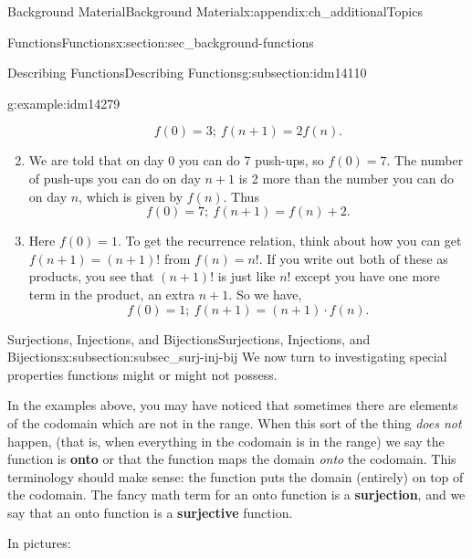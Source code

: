 \documentclass[oneside,10pt,]{book}
\newcommand{\terminology}[1]{\textbf{#1}}
\numberwithin{equation}{chapter}
\begin{document}
\begin{appendixptx}{Background Material}{}{Background Material}{}{}{x:appendix:ch_additionalTopics}
\begin{sectionptx}{Functions}{}{Functions}{}{}{x:section:sec_background-functions}
\begin{subsectionptx}{Describing Functions}{}{Describing Functions}{}{}{g:subsection:idm14110}
\begin{example}{}{g:example:idm14279}
\begin{enumerate}
\begin{equation*}
f(0) = 3;~ f(n+1) = 2f(n).
\end{equation*}
%
\item{}We are told that on day 0 you can do 7 push-ups, so \(f(0) = 7\).  The number of push-ups you can do on day \(n+1\) is 2 more than the number you can do on day \(n\), which is given by \(f(n)\).  Thus%
\begin{equation*}
f(0) = 7;~ f(n+1) = f(n) + 2.
\end{equation*}
%
\item{}Here \(f(0) = 1\).  To get the recurrence relation, think about how you can get \(f(n+1) = (n+1)!\) from \(f(n) = n!\).  If you write out both of these as products, you see that \((n+1)!\) is just like \(n!\) except you have one more term in the product, an extra \(n+1\).  So we have,%
\begin{equation*}
f(0) = 1;~ f(n+1) = (n+1)\cdot f(n).
\end{equation*}
%
\end{enumerate}
%
\end{example}
\end{subsectionptx}
%
%
\typeout{************************************************}
\typeout{************************************************}
%
\begin{subsectionptx}{Surjections, Injections, and Bijections}{}{Surjections, Injections, and Bijections}{}{}{x:subsection:subsec_surj-inj-bij}
We now turn to investigating special properties functions might or might not possess.%
\par
In the examples above, you may have noticed that sometimes there are elements of the codomain which are not in the range. When this sort of the thing \emph{does not} happen, (that is, when everything in the codomain is in the range) we say the function is \terminology{onto} or that the function maps the domain \emph{onto} the codomain. This terminology should make sense: the function puts the domain (entirely) on top of the codomain. The fancy math term for an onto function is a \terminology{surjection}, and we say that an onto function is a \terminology{surjective} function.%
\par
In pictures:%
\begin{sidebyside}{2}{0.1}{0.1}{0.2}%
\begin{sbspanel}{0.3}%
\resizebox{\linewidth}{!}{%
  \begin{tikzpicture}

\end{tikzpicture}}
\end{sbspanel}
\end{sidebyside}
\end{subsectionptx}
\end{sectionptx}
\end{appendixptx}
\end{document}
